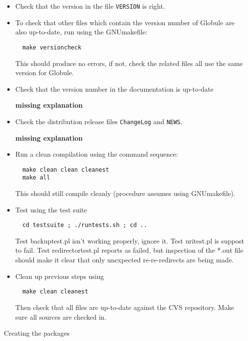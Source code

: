 \documentclass[10pt,twoside]{article}
\makeatletter
\def\section{\@startsection{section}{1}
{\z@}{-2.5ex plus -0.5ex minus -0.1ex}{0.5ex plus 0.1ex}{\large\bf}}
\makeatother
\begin{document}
\begin{itemize}
\item Check that the version in the file \texttt{VERSION} is
right.

\item To check that other files which contain the version number of Globule
are also up-to-date, run using the GNUmakefile:
\begin{verbatim}
  make versioncheck
\end{verbatim}
This should produce no errors, if not, check the related files all use
the same version for Globule.

\item Check that the version number in the documentation is up-to-date

\textbf{missing explanation}

\item Check the distribution release files \texttt{ChangeLog} and \texttt{NEWS}.

\textbf{missing explanation}

\item Run a clean compilation using the command sequence:
\begin{verbatim}
  make clean clean cleanest
  make all
\end{verbatim}
This should still compile cleanly (procedure assumes using GNUmakefile).

\item Test using the test suite
\begin{verbatim}
  cd testsuite ; ./runtests.sh ; cd ..
\end{verbatim}
Test backuptest.pl isn't working properly, ignore it.
Test uritest.pl is suppost to fail.  Test redirectortest.pl reports as
failed, but inspection of the *.out file should make it clear that only
unexpected re-re-redirects are being made.

\item Clean up previous steps using
\begin{verbatim}
  make clean cleanest
\end{verbatim}
Then check that all files are up-to-date against the CVS repository.
Make sure all sources are checked in.

\end{itemize}

\section{Creating the packages}
\end{document}
